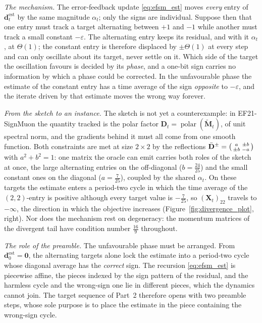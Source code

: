 \subsubsection*{}

\emph{The mechanism.} The error-feedback update \eqref{eq:efsm_est} moves
\emph{every} entry of $\mathbf d_t^{\mathrm{est}}$ by the same magnitude
$\alpha_t$; only the signs are individual. Suppose then that one entry must
track a target alternating
between $+1$ and $-1$ while another must track a small constant
$-\varepsilon$. The alternating entry keeps its residual, and with it
$\alpha_t$, at $\Theta(1)$; the constant entry is therefore displaced by
$\pm\Theta(1)$ at every step and can only oscillate about its target, never
settle on it. Which side of the target the oscillation favours is decided by
its \emph{phase}, and a one-bit sign carries no information by which a phase
could be corrected. In the unfavourable phase the estimate of the constant
entry has a time average of the sign \emph{opposite} to $-\varepsilon$, and
the iterate driven by that estimate moves the wrong way forever.

\emph{From the sketch to an instance.} The sketch is not yet a counterexample:
in EF21-SignMuon the quantity tracked is the polar factor
$\mathbf D_t=\operatorname{polar}(\tilde{\mathbf M}_t)$, of unit spectral
norm, and the gradients behind it must all come from one smooth
function. Both constraints are met at size $2\times2$ by the reflections
$\bar{\mathbf D}^{\pm}=\bigl(\begin{smallmatrix}a&\pm b\\\pm b&-a\end{smallmatrix}\bigr)$ with $a^2+b^2=1$: one
matrix the oracle can emit carries both roles of the sketch at once, the
large alternating entries on the off-diagonal ($b=\tfrac{24}{25}$) and the
small constant ones on the diagonal ($a=\tfrac7{25}$), coupled by the shared
$\alpha_t$. On these targets the estimate enters a period-two cycle in which
the time average of the $(2,2)$-entry is positive although every target value
is $-\tfrac7{25}$, so $(\mathbf X_t)_{22}$ travels to $-\infty$, the direction
in which the objective increases (Figure~\ref{fig:divergence_plot}, right). Nor does the mechanism rest on
degeneracy: the momentum matrices of the divergent tail have condition number
$\tfrac{16}{9}$ throughout.

\emph{The role of the preamble.} The unfavourable phase must be arranged.
From $\mathbf d_0^{\mathrm{est}}=\mathbf 0$, the alternating targets alone
lock the estimate into a period-two cycle whose diagonal average has the
\emph{correct} sign. The recursion \eqref{eq:efsm_est} is piecewise affine,
the pieces indexed by the sign pattern of the residual, and the harmless
cycle and the wrong-sign one lie in different pieces, which the dynamics
cannot join. The target sequence of Part~2 therefore opens with two preamble
steps, whose sole purpose is to place the estimate in the piece containing
the wrong-sign cycle.

